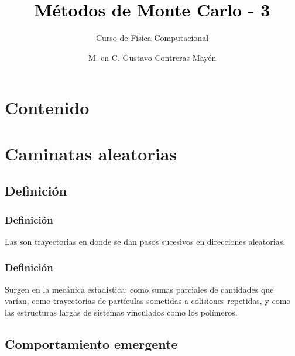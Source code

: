 \documentclass[12pt]{beamer}
\title{\textcolor{black}{Métodos de Monte Carlo - 3}}
\subtitle{Curso de Física Computacional}
\author[]{M. en C. Gustavo Contreras Mayén}
\begin{document}
\maketitle
\fontsize{14}{14}\selectfont
{}

\section*{Contenido}

\section{Caminatas aleatorias}
\subsection{Definición}

\begin{frame}
\frametitle{Definición}
Las  son trayectorias en donde se dan pasos sucesivos en direcciones aleatorias.
\end{frame}
\begin{frame}
\frametitle{Definición}
Surgen en la mecánica estadística: como sumas parciales de cantidades que varían, \pause como trayectorias de partículas sometidas a colisiones repetidas, \pause y como las estructuras largas de sistemas vinculados como los polímeros.
\end{frame}

\subsection*{Comportamiento emergente}
\end{document}
